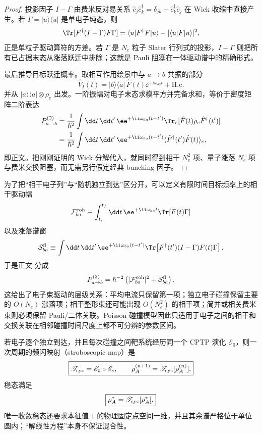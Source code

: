 \begin{proof}
投影因子 $I-\Gamma$ 由费米反对易关系
$\hat c_j\hat c_k^\dagger=\delta_{jk}-\hat c_k^\dagger\hat c_j$
在 Wick 收缩中直接产生。若 $\Gamma=|u\rangle\langle u|$ 是单电子纯态，则
\[
\Tr[F^\dagger(I-\Gamma)F\Gamma]
=\langle u|F^\dagger F|u\rangle
-|\langle u|F|u\rangle|^2,
\]
正是单粒子驱动算符的方差。若 $\Gamma$ 是 $N_e$ 粒子 Slater 行列式的投影，$I-\Gamma$ 则把所有已占据末态从涨落跃迁中排除；这就是 Pauli 阻塞在一体驱动谱中的精确形式。

最后推导目标跃迁概率。取相互作用绘景中与 $a\to b$ 共振的部分
\[
\hat V_I(t)
=|b\rangle\langle a|\,
\hat F(t)\ee^{+\ii\omega_{ba}t}
+\mathrm{H.c.}
\]
并从 $|a\rangle\langle a|\otimes\rho_e$ 出发。一阶振幅对电子末态求模平方并完备求和，等价于密度矩阵二阶表达
\begin{align*}
P_{a\to b}^{(2)}
&=\frac1{\hbar^2}
\int\dd t\,\dd t'\,
\ee^{+\ii\omega_{ba}(t-t')}
\Tr_e[
\hat F(t)\rho_e\hat F^\dagger(t')]\\
&=\frac1{\hbar^2}
\int\dd t\,\dd t'\,
\ee^{+\ii\omega_{ba}(t-t')}
\langle\hat F^\dagger(t')\hat F(t)\rangle_e,
\end{align*}
即正文。把刚刚证明的 Wick 分解代入，就同时得到相干 $N_e^2$ 项、量子涨落 $N_e$ 项与费米交换阻塞，而无需另行假定经典 bunching 因子。
\end{proof}


为了把“相干电子列”与“随机独立到达”区分开，可以定义有限时间目标频率上的相干驱动幅
\begin{equation*}
\mathcal F_{ba}^{\rm coh}
\equiv
\int_{t_i}^{t_f}\dd t\,
\ee^{+\ii\omega_{ba}t}
\Tr[F(t)\Gamma]
\end{equation*}
以及涨落谱窗
\begin{equation*}
\mathcal S_{ba}^{\rm fl}
\equiv
\int\dd t\,\dd t'\,
\ee^{+\ii\omega_{ba}(t-t')}
\Tr\!\left[
F^\dagger(t')(I-\Gamma)F(t)\Gamma
\right].
\end{equation*}
于是正文 分成
\[
P_{a\to b}^{(2)}
=\hbar^{-2}
\left(
|\mathcal F_{ba}^{\rm coh}|^2
+\mathcal S_{ba}^{\rm fl}
\right).
\]
这给出了电子束驱动的层级关系：平均电流只保留第一项；独立电子碰撞保留主要的 $O(N_e)$ 涨落项；相干整形束还可能出现 $O(N_e^2)$ 的相干项；简并或相关费米束则必须保留 Pauli/二体关联。Poisson 碰撞模型因此只适用于电子之间的相干和交换关联在相邻碰撞时间尺度上都不可分辨的参数区间。

若电子逐个独立到达，并且每次碰撞之间靶系统经历同一个 CPTP 演化 $\mathscr E_0$，则一次周期的频闪映射（stroboscopic map）是
\begin{equation}
\boxed{
\mathscr T_{\rm cyc}=\mathscr E_0\circ\mathscr E_e,
\qquad
\rho_A^{(n+1)}=\mathscr T_{\rm cyc}[\rho_A^{(n)}].}
\label{eq:feberi_stroboscopic_map}
\end{equation}
稳态满足
\begin{equation}
\boxed{
\rho_A^*=\mathscr T_{\rm cyc}[\rho_A^*].}
\label{eq:general_collision_fixed_point}
\end{equation}
唯一收敛稳态还要求本征值 $1$ 的物理固定点空间一维，并且其余谱严格位于单位圆内；“解线性方程”本身不保证混合性。


